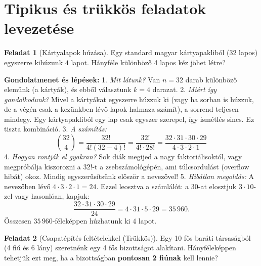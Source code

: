 \documentclass[a4paper,12pt]{article}
\theoremstyle{definition} %
\newtheorem*{problem}{Feladat}
\begin{document}
\section{Tipikus és trükkös feladatok levezetése}

\begin{problem}[Kártyalapok húzása]
Egy standard magyar kártyapakliból ($32$ lapos) egyszerre kihúzunk $4$ lapot. Hányféle különböző 4 lapos kéz jöhet létre?
\end{problem}

\textbf{Gondolatmenet és lépések:}
1. \textit{Mit látunk?} Van $n = 32$ darab különböző elemünk (a kártyák), és ebből választunk $k = 4$ darazat.
2. \textit{Miért így gondolkodunk?} Mivel a kártyákat egyszerre húzzuk ki (vagy ha sorban is húzzuk, de a végén csak a kezünkben lévő lapok halmaza számít), a sorrend teljesen mindegy. Egy kártyapakliból egy lap csak egyszer szerepel, így ismétlés sincs. Ez tiszta kombináció.
3. \textit{A számítás:}
$$\binom{32}{4} = \frac{32!}{4!(32-4)!} = \frac{32!}{4! \cdot 28!} = \frac{32 \cdot 31 \cdot 30 \cdot 29}{4 \cdot 3 \cdot 2 \cdot 1}$$
4. \textit{Hogyan rontják el gyakran?} Sok diák megijed a nagy faktoriálisoktól, vagy megpróbálja kiszorozni a $32!$-t a zsebszámológépén, ami túlcsordulást (overflow hibát) okoz. Mindig egyszerűsítsünk először a nevezővel!
5. \textit{Hibátlan megoldás:} 
A nevezőben lévő $4 \cdot 3 \cdot 2 \cdot 1 = 24$. Ezzel leosztva a számlálót: a $30$-at elosztjuk $3 \cdot 10$-zel vagy hasonlóan, kapjuk:
$$\frac{32 \cdot 31 \cdot 30 \cdot 29}{24} = 4 \cdot 31 \cdot 5 \cdot 29 = 35\,960.$$
Összesen $35\,960$-féleképpen húzhatunk ki $4$ lapot.

\vspace{1em}

\begin{problem}[Csapatépítés feltételekkel (Trükkös)]
Egy 10 fős baráti társaságból (4 fiú és 6 lány) szeretnénk egy 4 fős bizottságot alakítani. Hányféleképpen tehetjük ezt meg, ha a bizottságban \textbf{pontosan 2 fiúnak} kell lennie?
\end{problem}
\end{document}
